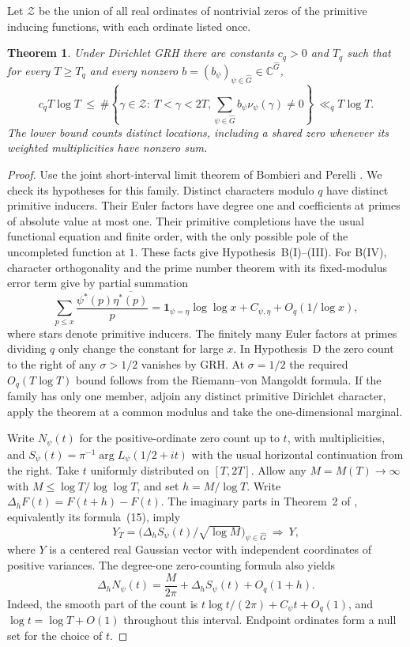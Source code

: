 \documentclass[11pt]{article}
\newtheorem{theorem}{Theorem}
\begin{document}
Let $\mathcal Z$ be the union of all real ordinates of nontrivial zeros of the primitive inducing functions, with each ordinate listed once.

\begin{theorem}\label{thm:distinct-ordinates}
Under Dirichlet GRH there are constants \(c_q>0\) and \(T_q\) such that
for every \(T\ge T_q\) and every nonzero
\(b=(b_\psi)_{\psi\in\widehat G}\in\mathbb C^{\widehat G}\),
\[
 c_q T\log T\ \le\ \#\left\{\gamma\in\mathcal Z:\ T<\gamma<2T,
      \sum_{\psi\in\widehat G}b_\psi\nu_\psi(\gamma)\ne0\right\}
 \ \ll_q T\log T .
\]
The lower bound counts distinct locations, including a shared zero
whenever its weighted multiplicities have nonzero sum.
\end{theorem}

\begin{proof}
Use the joint short-interval limit theorem of Bombieri and Perelli
\cite[Theorem~2, pp.~274--275]{BP}. We check its hypotheses for this
family. Distinct characters modulo \(q\) have distinct primitive
inducers. Their Euler factors have degree one and coefficients at
primes of absolute value at most one. Their primitive completions have
the usual functional equation and finite order, with the only possible
pole of the uncompleted function at \(1\). These facts give
Hypothesis~B(I)--(III). For B(IV), character orthogonality and the
prime number theorem with its fixed-modulus error term give by partial summation
\[
 \sum_{p\le x}\frac{\psi^*(p)\overline{\eta^*(p)}}p
 =\mathbf1_{\psi=\eta}\log\log x+C_{\psi,\eta}
   +O_q(1/\log x),
\]
where stars denote primitive inducers. The finitely many Euler factors
at primes dividing \(q\) only change the constant for large \(x\).
In Hypothesis~D the zero count to the right of any
\(\sigma>1/2\) vanishes by GRH. At \(\sigma=1/2\) the required
\(O_q(T\log T)\) bound follows from the Riemann--von Mangoldt formula.
If the family has only one member, adjoin any distinct primitive
Dirichlet character, apply the theorem at a common modulus and take the
one-dimensional marginal.

Write \(N_\psi(t)\) for the positive-ordinate zero count up to \(t\),
with multiplicities, and \(S_\psi(t)=\pi^{-1}\arg L_\psi(1/2+it)\)
with the usual horizontal continuation from the right. Take \(t\)
uniformly distributed on \([T,2T]\). Allow any \(M=M(T)\to\infty\)
with \(M\le\log T/\log\log T\), and set \(h=M/\log T\). Write
\(\Delta_h F(t)=F(t+h)-F(t)\). The imaginary parts in Theorem~2
of \cite{BP}, equivalently its formula~(15), imply
\[
  Y_T=\bigl(\Delta_h S_\psi(t)/\sqrt{\log M}\bigr)_{\psi\in\widehat G}
   \ \Longrightarrow\ Y ,
\]
where \(Y\) is a centered real Gaussian vector with independent
coordinates of positive variances. The degree-one zero-counting
formula \cite[(1), p.~272]{BP} also yields
\[
  \Delta_hN_\psi(t)=\frac{M}{2\pi}
        +\Delta_hS_\psi(t)+O_q(1+h).
\]
Indeed, the smooth part of the count is
\(t\log t/(2\pi)+C_\psi t+O_q(1)\), and
\(\log t=\log T+O(1)\) throughout this interval. Endpoint ordinates
form a null set for the choice of \(t\).


\end{proof}
\end{document}
